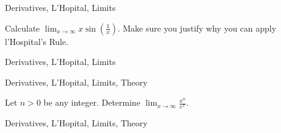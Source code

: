 \begin{tagblock}{Derivatives, L'Hopital, Limits}

\begin{question}

Calculate $\displaystyle\lim_{x\to \infty} {x} \sin(\frac{1}{x})$.  Make sure you justify why you can apply  l'Hospital's Rule.  


	
\begin{tags}
	   Derivatives, L'Hopital, Limits

\end{tags}
	
\begin{diary}
\end{diary}
	
\begin{solution}
	   
\end{solution}
	
\end{question}

\end{tagblock}


\begin{tagblock}{Derivatives, L'Hopital, Limits, Theory}

\begin{question}

Let $n>0$ be any integer.  Determine  $\displaystyle\lim_{x\to\infty}\frac {x^n}{e^{x}}$.   


	
\begin{tags}
	   Derivatives, L'Hopital, Limits, Theory

\end{tags}
	
\begin{diary}
\end{diary}
	
\begin{solution}
	   
\end{solution}
	
\end{question}

\end{tagblock}

